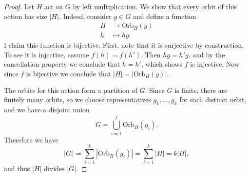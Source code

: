 \documentclass[11pt]{article}
\theoremstyle{definition}
\begin{document}
\begin{proof}
Let $H$ act on $G$ by left multiplication.
We show that every orbit of this action has size $|H|$. Indeed, consider $g\in G$ and define a function 
\[ \begin{aligned} H &\to \mathrm{Orb}_H(g)\\
h &\mapsto hg.\end{aligned}\]
I claim this function is bijective. First, note that it is surjective by construction. To see it is injective, assume $f(h)=f(h')$. Then $hg=h'g$, and by the cancellation property we conclude that $h=h'$, which shows $f$ is injective. Now since $f$ is bijective we conclude that $|H|=| \mathrm{Orb}_H(g)|$.

The orbits for this action form a partition of $G$. Since $G$ is finite, there are finitely many orbits, so we choose representatives $g_1, \ldots, g_k$ for each distinct orbit, and we have a disjoint union
$$G=\bigcup_{i=1}^j \mathrm{Orb}_H(g_i).$$ 
Therefore we have
$$|G|\,=\sum_{i=1}^k |\mathrm{Orb}_H(g_i)|=\sum_{i=1}^k |H|= k |H|,$$ 
and thus $|H|$ divides $|G|$. 
\end{proof}
\end{document}
